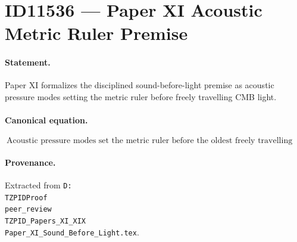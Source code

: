 \section*{ID11536 --- Paper XI Acoustic Metric Ruler Premise}

\paragraph{Statement.}
Paper XI formalizes the disciplined sound-before-light premise as acoustic pressure modes setting the metric ruler before freely travelling CMB light.

\paragraph{Canonical equation.}
\[
\boxed{\ \text{Acoustic pressure modes set the metric ruler before the oldest freely travelling light was released.}\ }
\]

\paragraph{Provenance.}
Extracted from \texttt{D:\\TZPIDProof\\peer\_review\\TZPID\_Papers\_XI\_XIX\\Paper\_XI\_Sound\_Before\_Light.tex}.
